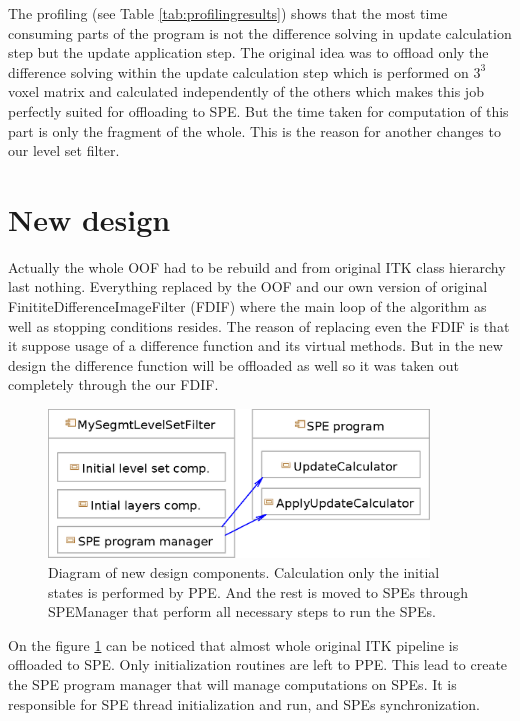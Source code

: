 \par
The profiling (see Table \ref{tab:profilingresults}) shows that the most time consuming parts of the program is not the difference solving in update calculation step but the update application step.
The original idea was to offload only the difference solving within the update calculation step which is performed on $3^3$ voxel matrix and calculated independently of the others which makes this job perfectly suited for offloading to SPE.
But the time taken for computation of this part is only the fragment of the whole.
This is the reason for another changes to our level set filter.

\section{New design}

\par
Actually the whole OOF had to be rebuild and from original ITK class hierarchy last nothing.
Everything replaced by the OOF and our own version of original FinititeDifferenceImageFilter (FDIF) where the main loop of the algorithm as well as stopping conditions resides.
The reason of replacing even the FDIF is that it suppose usage of a difference function and its virtual methods.
But in the new design the difference function will be offloaded as well so it was taken out completely through the our FDIF.

\begin{figure}
    \centering
    \includegraphics[width=0.9\textwidth]{data/newDesign}
    \caption[Diagram of new design components]
{
Diagram of new design components. Calculation only the initial states is performed by PPE.
And the rest is moved to SPEs through SPEManager that perform all necessary steps to run the SPEs.
}
\label{fg:newDesign}
\end{figure}

On the figure \ref{fg:newDesign} can be noticed that almost whole original ITK pipeline is offloaded to SPE.
Only initialization routines are left to PPE. This lead to create the SPE program manager that will manage computations on SPEs.
It is responsible for SPE thread initialization and run, and SPEs synchronization.

